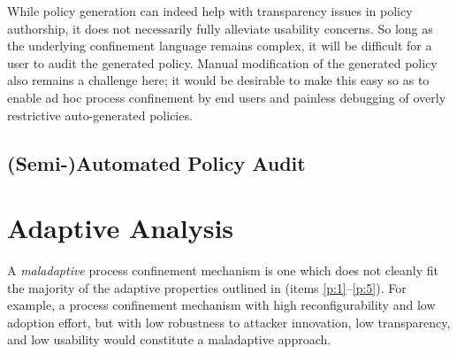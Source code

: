 \documentclass[dvipsnames, 12pt]{article}
\begin{document}

While policy generation can indeed help with transparency issues in policy
authorship, it does not necessarily fully alleviate usability concerns. So long
as the underlying confinement language remains complex, it will be difficult for
a user to audit the generated policy. Manual modification of the generated
policy also remains a challenge here; it would be desirable to make this easy so as
to enable ad hoc process confinement by end users and painless debugging of
overly restrictive auto-generated policies.

\subsection{(Semi-)Automated Policy Audit}

\section{Adaptive Analysis}


A \textit{maladaptive} process confinement mechanism is one which does not
cleanly fit the majority of the adaptive properties outlined in
 (items \ref{p:1}--\ref{p:5}). For example, a process
confinement mechanism with high reconfigurability and low adoption effort, but
with low robustness to attacker innovation, low transparency, and low usability
would constitute a maladaptive approach.



\FloatBarrier
\end{document}
